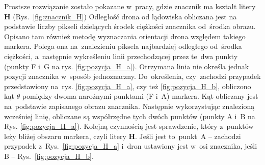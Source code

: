 Prostsze rozwiązanie zostało pokazane w~pracy\cite{H}, gdzie znacznik ma kształt litery \textbf{H} (Rys.~\ref{fig:znacznik_H}) 
Odległość drona od lądowiska obliczana jest na podstawie liczby pikseli dzielących środek ciężkości znacznika od~środka obrazu. 
Opisano tam również metodę wyznaczania orientacji drona względem takiego markera. 
Polega ona na~znalezieniu piksela najbardziej odległego od~środka ciężkości, a~następnie wykreśleniu linii przechodzącej przez te~dwa punkty (punkty F i~G na rys. \ref{fig:pozycja_H_a}).  %
Otrzymana linia nie określa jednak pozycji znacznika w~sposób jednoznaczny.
Do~określenia, czy~zachodzi przypadek przedstawiony na~rys. \ref{fig:pozycja_H_a}, czy też \ref{fig:pozycja_H_b}, obliczono kąt $\theta$ pomiędzy dwoma narożnymi punktami (F i~A) markera. %
Kąt obliczany jest na~podstawie zapisanego obrazu znacznika. 
Następnie wykorzystując znalezioną wcześniej linię, obliczane są współrzędne tych dwóch punktów (punkty A i~B na Rys. \ref{fig:pozycja_H_a}). 
Kolejną czynnością jest sprawdzenie, który z~punktów leży bliżej obszaru markera, czyli litery \textbf{H}. %
Jeśli jest to~punkt~A -- zachodzi przypadek z~Rys.~\ref{fig:pozycja_H_a} i~dron ustawiony jest w~osi znacznika, jeśli B -- Rys.~\ref{fig:pozycja_H_b}.
